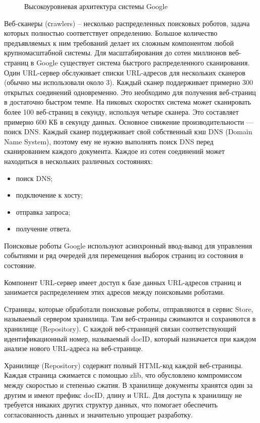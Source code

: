 \begin{figure}[H]
\caption{Высокоуровневая архитектура системы Google}
\label{google_concept:image}
\end{figure}

Веб-сканеры (сrawlers) -- несколько распределенных поисковых роботов, задача которых полностью соответствует определению. Большое количество предъявляемых к ним требований делает их сложным компонентом любой крупномасштабной системы. 
Для масштабирования до сотен миллионов веб-страниц в Google существует система быстрого распределенного сканирования. Один URL-сервер обслуживает списки URL-адресов для нескольких сканеров (обычно мы использовали около 3). Каждый сканер поддерживает примерно 300 открытых соединений одновременно. Это необходимо для получения веб-страниц в достаточно быстром темпе. На пиковых скоростях система может сканировать более 100 веб-страниц в секунду, используя четыре сканера. Это составляет примерно 600 КБ в секунду данных. Основное снижение производительности — поиск DNS. Каждый сканер поддерживает свой собственный кэш DNS (Domain Name System), поэтому ему не нужно выполнять поиск DNS перед сканированием каждого документа. Каждое из сотен соединений может находиться в нескольких различных состояниях:
\begin{itemize}
\item поиск DNS;
\item подключение к хосту;
\item отправка запроса;
\item получение ответа.
\end{itemize}
Поисковые роботы Google используют асинхронный ввод-вывод для управления событиями и ряд очередей для перемещения выборок страниц из состояния в состояние.

Компонент URL-сервер имеет доступ к базе данных URL-адресов страниц и занимается распределением этих адресов между поисковыми роботами.

Страницы, которые обработали поисковые роботы, отправляются в сервис Store, называемый сервером хранилища. Там веб-страницы сжимаются и сохраняются в хранилище (Repository). С каждой веб-страницей связан соответствующий идентификационный номер, называемый docID, который назначается при каждом анализе нового URL-адреса на веб-странице.

Хранилище  (Repository) содержит полный HTML-код каждой веб-страницы. Каждая страница сжимается с помощью zlib, что обусловлено компромиссом между скоростью и степенью сжатия. 
В хранилище документы хранятся один за другим и имеют префикс docID, длину и URL. Для доступа к хранилищу не требуется никаких других структур данных, что помогает обеспечить согласованность данных и значительно упрощает разработку.

